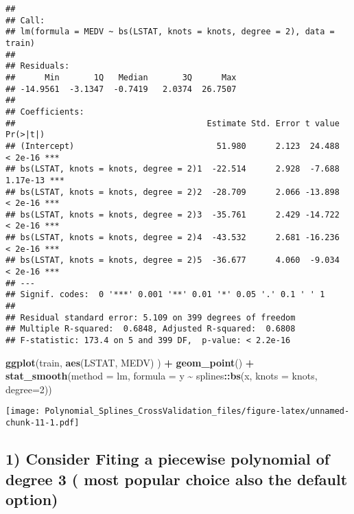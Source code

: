 \documentclass[
]{article}
\newenvironment{Shaded}{\begin{snugshade}}{\end{snugshade}}
\newcommand{\AttributeTok}[1]{\textcolor[rgb]{0.13,0.29,0.53}{#1}}
\newcommand{\DecValTok}[1]{\textcolor[rgb]{0.00,0.00,0.81}{#1}}
\newcommand{\FunctionTok}[1]{\textcolor[rgb]{0.13,0.29,0.53}{\textbf{#1}}}
\newcommand{\NormalTok}[1]{#1}
\newcommand{\SpecialCharTok}[1]{\textcolor[rgb]{0.81,0.36,0.00}{\textbf{#1}}}
\begin{document}
\begin{verbatim}
## 
## Call:
## lm(formula = MEDV ~ bs(LSTAT, knots = knots, degree = 2), data = train)
## 
## Residuals:
##      Min       1Q   Median       3Q      Max 
## -14.9561  -3.1347  -0.7419   2.0374  26.7507 
## 
## Coefficients:
##                                       Estimate Std. Error t value Pr(>|t|)    
## (Intercept)                             51.980      2.123  24.488  < 2e-16 ***
## bs(LSTAT, knots = knots, degree = 2)1  -22.514      2.928  -7.688 1.17e-13 ***
## bs(LSTAT, knots = knots, degree = 2)2  -28.709      2.066 -13.898  < 2e-16 ***
## bs(LSTAT, knots = knots, degree = 2)3  -35.761      2.429 -14.722  < 2e-16 ***
## bs(LSTAT, knots = knots, degree = 2)4  -43.532      2.681 -16.236  < 2e-16 ***
## bs(LSTAT, knots = knots, degree = 2)5  -36.677      4.060  -9.034  < 2e-16 ***
## ---
## Signif. codes:  0 '***' 0.001 '**' 0.01 '*' 0.05 '.' 0.1 ' ' 1
## 
## Residual standard error: 5.109 on 399 degrees of freedom
## Multiple R-squared:  0.6848, Adjusted R-squared:  0.6808 
## F-statistic: 173.4 on 5 and 399 DF,  p-value: < 2.2e-16
\end{verbatim}

\begin{Shaded}
\begin{Highlighting}[]
\FunctionTok{ggplot}\NormalTok{(train, }\FunctionTok{aes}\NormalTok{(LSTAT, MEDV) ) }\SpecialCharTok{+} \FunctionTok{geom\_point}\NormalTok{() }\SpecialCharTok{+}
\FunctionTok{stat\_smooth}\NormalTok{(}\AttributeTok{method =}\NormalTok{ lm, }\AttributeTok{formula =}\NormalTok{ y }\SpecialCharTok{\textasciitilde{}}\NormalTok{ splines}\SpecialCharTok{::}\FunctionTok{bs}\NormalTok{(x, }\AttributeTok{knots =}\NormalTok{ knots, }\AttributeTok{degree=}\DecValTok{2}\NormalTok{))}
\end{Highlighting}
\end{Shaded}

\texttt{[image: Polynomial\_Splines\_CrossValidation\_files/figure-latex/unnamed-chunk-11-1.pdf]}

\hypertarget{consider-fiting-a-piecewise-polynomial-of-degree-3-most-popular-choice-also-the-default-option}{%
\subsection{1) Consider Fiting a piecewise polynomial of degree 3 ( most
popular choice also the default
option)}\label{consider-fiting-a-piecewise-polynomial-of-degree-3-most-popular-choice-also-the-default-option}}
\end{document}

